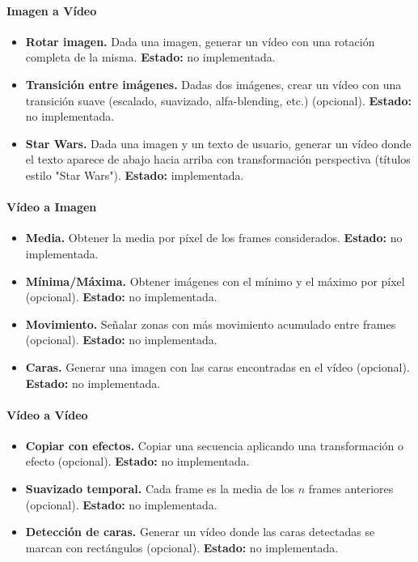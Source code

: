 \paragraph{Imagen a Vídeo}
\begin{itemize}
	\item \textbf{Rotar imagen.} Dada una imagen, generar un vídeo con una rotación completa de la misma. \textbf{Estado:} no implementada.
	\item \textbf{Transición entre imágenes.} Dadas dos imágenes, crear un vídeo con una transición suave (escalado, suavizado, alfa-blending, etc.) (opcional). \textbf{Estado:} no implementada.
	\item \textbf{Star Wars.} Dada una imagen y un texto de usuario, generar un vídeo donde el texto aparece de abajo hacia arriba con transformación perspectiva (títulos estilo "Star Wars"). \textbf{Estado:} implementada.
\end{itemize}

\paragraph{Vídeo a Imagen}
\begin{itemize}
	\item \textbf{Media.} Obtener la media por píxel de los frames considerados. \textbf{Estado:} no implementada.
	\item \textbf{Mínima/Máxima.} Obtener imágenes con el mínimo y el máximo por píxel (opcional). \textbf{Estado:} no implementada.
	\item \textbf{Movimiento.} Señalar zonas con más movimiento acumulado entre frames (opcional). \textbf{Estado:} no implementada.
	\item \textbf{Caras.} Generar una imagen con las caras encontradas en el vídeo (opcional). \textbf{Estado:} no implementada.
\end{itemize}

\paragraph{Vídeo a Vídeo}
\begin{itemize}
	\item \textbf{Copiar con efectos.} Copiar una secuencia aplicando una transformación o efecto (opcional). \textbf{Estado:} no implementada.
	\item \textbf{Suavizado temporal.} Cada frame es la media de los $n$ frames anteriores (opcional). \textbf{Estado:} no implementada.
	\item \textbf{Detección de caras.} Generar un vídeo donde las caras detectadas se marcan con rectángulos (opcional). \textbf{Estado:} no implementada.
\end{itemize}

